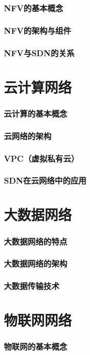 \documentclass{book}
\begin{document}
\subsubsection{NFV的基本概念}
\subsubsection{NFV的架构与组件}
\subsubsection{NFV与SDN的关系}
\section{云计算网络}
\subsubsection{云计算的基本概念}
\subsubsection{云网络的架构}
\subsubsection{VPC（虚拟私有云）}
\subsubsection{SDN在云网络中的应用}
\section{大数据网络}
\subsubsection{大数据网络的特点}
\subsubsection{大数据网络的架构}
\subsubsection{大数据传输技术}
\section{物联网网络}
\subsubsection{物联网的基本概念}
\end{document}
